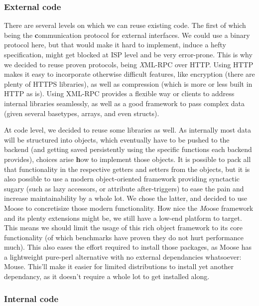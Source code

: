 \documentclass{article}
\begin{document}
\subsubsection{External code}

There are several levels on which we can reuse existing code. The first of which being the {\textbf communication protocol for external interfaces}. We could use a binary protocol here, but that would make it hard to implement, induce a hefty specification, might get blocked at ISP level and be very error-prone. This is why we decided to reuse proven protocols, being {\textit XML-RPC over HTTP}. Using HTTP makes it easy to incorporate otherwise difficult features, like encryption (there are plenty of HTTPS libraries), as well as compression (which is more or less built in HTTP as is). Using XML-RPC provides a flexible way or clients to address internal libraries seamlessly, as well as a good framework to pass complex data (given several basetypes, arrays, and even structs).

At code level, we decided to reuse some libraries as well. As internally most data will be structured into objects, which eventually have to be pushed to the backend (and getting saved persistently using the specific functions each backend provides), choices arise {\textbf how to implement those objects}. It is possible to pack all that functionality in the respective getters and setters from the objects, but it is also possible to use a modern object-oriented framework providing synctactic sugary (such as lazy accessors, or attribute after-triggers) to ease the pain and increase maintainability by a whole lot. We chose the latter, and decided to use Moose to concretisize those modern functionality.
How nice the {\textit Moose framework} and its plenty extensions might be, we still have a low-end platform to target. This means we should limit the usage of this rich object framework to its core functionality (of which benchmarks have proven they do not hurt performance much). This also eases the effort required to install those packages, as Moose has a lightweight pure-perl alternative with no external dependancies whatsoever: Mouse. This'll make it easier for limited distributions to install yet another dependancy, as it doesn't require a whole lot to get installed along.

\subsubsection{Internal code}
\end{document}
